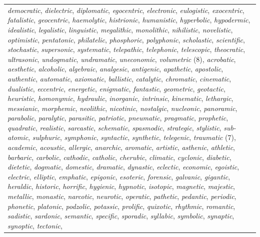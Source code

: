 \begin{table}[!htbp]
{\begin{tabular}[t]{l}
{\begin{minipage}[t]{\textwidth}
\textit{democratic}, \textit{dielectric}, \textit{diplomatic}, \textit{egocentric}, \textit{electronic}, \textit{eulogistic}, \textit{exocentric}, \textit{fatalistic}, \textit{geocentric}, \textit{haemolytic}, \textit{histrionic}, \textit{humanistic}, \textit{hyperbolic}, \textit{hypodermic}, \textit{idealistic}, \textit{legalistic}, \textit{linguistic}, \textit{megalithic}, \textit{monolithic}, \textit{nihilistic}, \textit{novelistic}, \textit{optimistic}, \textit{pentatonic}, \textit{philatelic}, \textit{phosphoric}, \textit{polyphonic}, \textit{scholastic}, \textit{scientific}, \textit{stochastic}, \textit{supersonic}, \textit{systematic}, \textit{telepathic}, \textit{telephonic}, \textit{telescopic}, \textit{theocratic}, \textit{ultrasonic}, \textit{undogmatic}, \textit{undramatic}, \textit{uneconomic}, \textit{volumetric} (8), \textit{acrobatic}, \textit{aesthetic}, \textit{alcoholic}, \textit{algebraic}, \textit{analgesic}, \textit{antigenic}, \textit{apathetic}, \textit{apostolic}, \textit{authentic}, \textit{automatic}, \textit{axiomatic}, \textit{ballistic}, \textit{catalytic}, \textit{chromatic}, \textit{cinematic}, \textit{dualistic}, \textit{eccentric}, \textit{energetic}, \textit{enigmatic}, \textit{fantastic}, \textit{geometric}, \textit{geotactic}, \textit{heuristic}, \textit{homonymic}, \textit{hydraulic}, \textit{inorganic}, \textit{intrinsic}, \textit{kinematic}, \textit{lethargic}, \textit{messianic}, \textit{morphemic}, \textit{neolithic}, \textit{nicotinic}, \textit{nostalgic}, \textit{nucleonic}, \textit{panoramic}, \textit{parabolic}, \textit{paralytic}, \textit{parasitic}, \textit{patriotic}, \textit{pneumatic}, \textit{pragmatic}, \textit{prophetic}, \textit{quadratic}, \textit{realistic}, \textit{sarcastic}, \textit{schematic}, \textit{spasmodic}, \textit{strategic}, \textit{stylistic}, \textit{sub-atomic}, \textit{sulphuric}, \textit{symphonic}, \textit{syntactic}, \textit{synthetic}, \textit{telegenic}, \textit{traumatic} (7), \textit{academic}, \textit{acoustic}, \textit{allergic}, \textit{anarchic}, \textit{aromatic}, \textit{artistic}, \textit{asthenic}, \textit{athletic}, \textit{barbaric}, \textit{carbolic}, \textit{cathodic}, \textit{catholic}, \textit{cherubic}, \textit{climatic}, \textit{cyclonic}, \textit{diabetic}, \textit{dietetic}, \textit{dogmatic}, \textit{domestic}, \textit{dramatic}, \textit{dynastic}, \textit{eclectic}, \textit{economic}, \textit{egoistic}, \textit{electric}, \textit{elliptic}, \textit{emphatic}, \textit{epigonic}, \textit{esoteric}, \textit{forensic}, \textit{galvanic}, \textit{gigantic}, \textit{heraldic}, \textit{historic}, \textit{horrific}, \textit{hygienic}, \textit{hypnotic}, \textit{isotopic}, \textit{magnetic}, \textit{majestic}, \textit{metallic}, \textit{monastic}, \textit{narcotic}, \textit{neurotic}, \textit{operatic}, \textit{pathetic}, \textit{pedantic}, \textit{periodic}, \textit{phonetic}, \textit{platonic}, \textit{podzolic}, \textit{potassic}, \textit{prolific}, \textit{quixotic}, \textit{rhythmic}, \textit{romantic}, \textit{sadistic}, \textit{sardonic}, \textit{semantic}, \textit{specific}, \textit{sporadic}, \textit{syllabic}, \textit{symbolic}, \textit{synaptic}, \textit{synoptic}, \textit{tectonic}, 
\end{minipage}}
\end{tabular}}
\end{table}
